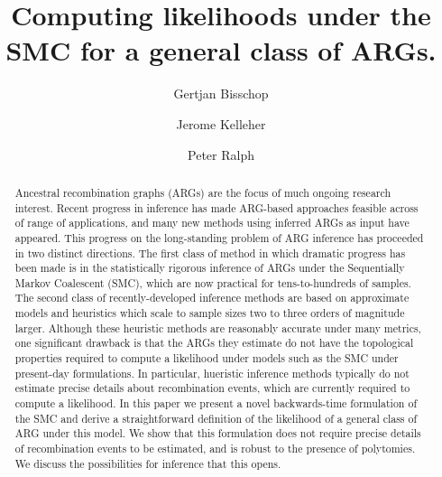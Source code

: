 \documentclass{article}
\begin{document}
\linenumbers
\title{Computing likelihoods under the SMC for a general class of ARGs.}

\author[1, $\dagger$]{Gertjan Bisschop}
\author[1]{Jerome Kelleher}
\author[3]{Peter Ralph}


\maketitle


\begin{abstract}
Ancestral recombination graphs (ARGs) are the focus of much ongoing research
interest. Recent progress in inference has made ARG-based approaches feasible
across of range of applications, and many new methods using inferred ARGs as
input have appeared. This progress on the long-standing problem of ARG
inference has proceeded in two distinct directions. The first
class of method in which dramatic progress has been made is in the
statistically rigorous inference of ARGs under the Sequentially Markov
Coalescent (SMC), which are now practical for tens-to-hundreds of samples. 
The second class of recently-developed inference methods are based on
approximate models and heuristics which scale to sample sizes two to three
orders of magnitude larger. Although these heuristic methods are reasonably
accurate under many metrics, one significant drawback is that the ARGs they 
estimate do not have the topological properties required to compute a 
likelihood under models such as the SMC under present-day formulations.
In particular, hueristic inference methods typically do not estimate
precise details about recombination events, which are currently
required to compute a likelihood.
In this paper we present a 
novel backwards-time formulation of the SMC 
and derive a straightforward definition 
of the likelihood of a general class of ARG under this model. 
We show that this formulation does not require precise details of recombination events
to be estimated, and is robust to the presence of polytomies. 
We discuss the possibilities for inference that this opens.
\end{abstract}


\end{document}
